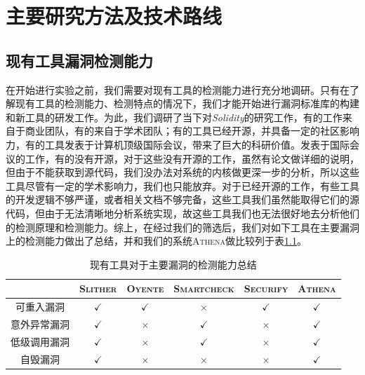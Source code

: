 
\chapter{主要研究方法及技术路线}

\section{现有工具漏洞检测能力}

在开始进行实验之前，我们需要对现有工具的检测能力进行充分地调研。只有在了解现有工具的检测能力、检测特点的情况下，我们才能开始进行漏洞标准库的构建和新工具的研发工作。为此，我们调研了当下对\emph{Solidity}的研究工作，有的工作来自于商业团队，有的来自于学术团队；有的工具已经开源，并具备一定的社区影响力，有的工具发表于计算机顶级国际会议，带来了巨大的科研价值。发表于国际会议的工作，有的没有开源，对于这些没有开源的工作，虽然有论文做详细的说明，但由于不能获取到源代码，我们没办法对系统的内核做更深一步的分析，所以这些工具尽管有一定的学术影响力，我们也只能放弃。对于已经开源的工作，有些工具的开发逻辑不够严谨，或者相关文档不够完备，这些工具我们虽然能取得它们的源代码，但由于无法清晰地分析系统实现，故这些工具我们也无法很好地去分析他们的检测原理和检测能力。综上，在经过我们的筛选后，我们对如下工具在主要漏洞上的检测能力做出了总结，并和我们的系统\textsc{Athena}做比较列于表\ref{tab:detection_capability}。

\begin{table}
  \centering\small
  \caption{现有工具对于主要漏洞的检测能力总结}
  \begin{tabular}{cccccc}
    \toprule
     & \textsc{Slither} & \textsc{Oyente} & \textsc{Smartcheck} & \textsc{Securify} & \textsc{Athena} \\
     \midrule
    可重入漏洞 & $\checkmark$ & $\checkmark$ & $\times$ & $\checkmark$ & $\checkmark$ \\
    意外异常漏洞 & $\checkmark$ & $\times$ & $\checkmark$ & $\times$ & $\checkmark$ \\
    低级调用漏洞 & $\checkmark$ & $\times$ & $\checkmark$ & $\times$ & $\checkmark$ \\
    自毁漏洞 & $\checkmark$ & $\times$ & $\times$ & $\times$ & $\checkmark$ \\
    \bottomrule
  \end{tabular}
  \label{tab:detection_capability}
\end{table}

